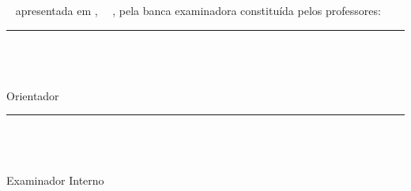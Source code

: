 
%    


\begin{folhadeaprovacao}
\begin{center}
    {\large \textsc{\imprimirautor}} \\
   	\vspace{2cm}	
    {\textsc{\Large \textbf{\imprimirtitulo}}} \\
		\vspace{2cm}
\end{center}		


\noindent \imprimirtipotrabalho~ apresentada em \imprimirlocal,~ \imprimirdata~,  pela banca examinadora constituída pelos professores:
\vspace{2cm}
\begin{center}

       \rule{10cm}{.1pt} \\
       {\imprimirorientador} \\ {\imprimirttorientador} \\
			 Orientador 
       \vfill
			 \vfill
       \rule{10cm}{.1pt} \\
       {\imprimirexaminadorum} \\ {\imprimirttexaminadorum} \\ Examinador Interno
        \vfill
				\vfill
				\vfill
\end{center}
  
\end{folhadeaprovacao}
